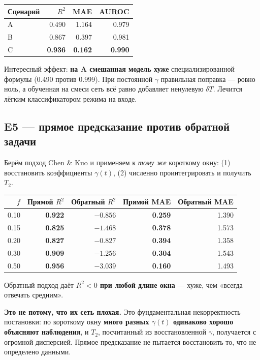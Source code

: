 \documentclass[12pt,a4paper]{article}
\begin{document}
\begin{center}
\begin{tabular}{@{}lrrr@{}}
\toprule
Сценарий & $R^2$ & MAE & AUROC \\
\midrule
A & 0.490 & 1.164 & 0.979 \\
B & 0.867 & 0.397 & 0.981 \\
C & \textbf{0.936} & \textbf{0.162} & \textbf{0.990} \\
\bottomrule
\end{tabular}
\end{center}

Интересный эффект: \textbf{на A смешанная модель хуже} специализированной
формулы (0.490 против 0.999). При постоянной $\gamma$ правильная поправка —
ровно ноль, а обученная на смеси сеть всё равно добавляет ненулевую $\delta T$.
Лечится лёгким классификатором режима на входе.

\subsection{E5 — прямое предсказание против обратной задачи}

Берём подход Chen \& Kuo и применяем к \emph{тому же} короткому окну:
(1) восстановить коэффициенты $\gamma(t)$, (2) численно проинтегрировать и
получить $T_2$.

\begin{center}
\begin{tabular}{@{}rrrrr@{}}
\toprule
$f$ & Прямой $R^2$ & Обратный $R^2$ & Прямой MAE & Обратный MAE \\
\midrule
0.10 & \textbf{0.922} & $-0.856$ & \textbf{0.259} & 1.390 \\
0.15 & \textbf{0.825} & $-1.468$ & \textbf{0.378} & 1.573 \\
0.20 & \textbf{0.827} & $-0.827$ & \textbf{0.394} & 1.358 \\
0.30 & \textbf{0.909} & $-1.256$ & \textbf{0.304} & 1.543 \\
0.50 & \textbf{0.956} & $-3.039$ & \textbf{0.160} & 1.493 \\
\bottomrule
\end{tabular}
\end{center}

Обратный подход даёт \textbf{$R^2<0$ при любой длине окна} — хуже, чем «всегда
отвечать средним».

\textbf{Это не потому, что их сеть плохая.} Это фундаментальная некорректность
постановки: по короткому окну \textbf{много разных $\gamma(t)$ одинаково хорошо
объясняют наблюдения}, и $T_2$, посчитанный из восстановленной $\gamma$,
получается с огромной дисперсией. Прямое предсказание не пытается восстановить
то, что не определено данными.
\end{document}
